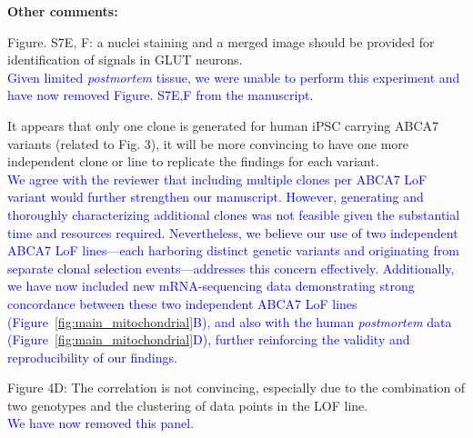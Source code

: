 \textbf{Other comments:}

Figure. S7E, F: a nuclei staining and a merged image should be provided for identification of signals in GLUT neurons.\\
\textcolor{blue}{Given limited \textit{postmortem} tissue, we were unable to perform this experiment and have now removed Figure. S7E,F from the manuscript.}

It appears that only one clone is generated for human iPSC carrying ABCA7 variants (related to Fig. 3), it will be more convincing to have one more independent clone or line to replicate the findings for each variant.\\
\textcolor{blue}{We agree with the reviewer that including multiple clones per ABCA7 LoF variant would further strengthen our manuscript. However, generating and thoroughly characterizing additional clones was not feasible given the substantial time and resources required. Nevertheless, we believe our use of two independent ABCA7 LoF lines—each harboring distinct genetic variants and originating from separate clonal selection events—addresses this concern effectively. Additionally, we have now included new mRNA-sequencing data demonstrating strong concordance between these two independent ABCA7 LoF lines (Figure~\ref{fig:main_mitochondrial}B), and also with the human \textit{postmortem} data (Figure~\ref{fig:main_mitochondrial}D), further reinforcing the validity and reproducibility of our findings.}

Figure 4D: The correlation is not convincing, especially due to the combination of two genotypes and the clustering of data points in the LOF line.\\
\textcolor{blue}{We have now removed this panel.}


